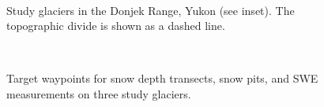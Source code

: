 \documentclass[12pt]{article}
\begin{document}
\begin{landscape}
\begin{figure}
	\centering
	\\
	\caption{Study glaciers in the Donjek Range, Yukon (see inset). The topographic divide is shown as a dashed line.}
	\label{studysites}
\end{figure}

\begin{figure}
	\centering
	\\
	\caption{Target waypoints for snow depth transects, snow pits, and SWE measurements on three study glaciers.}
	\label{transect_planned}
	\end{figure}


\end{landscape}
\end{document}
